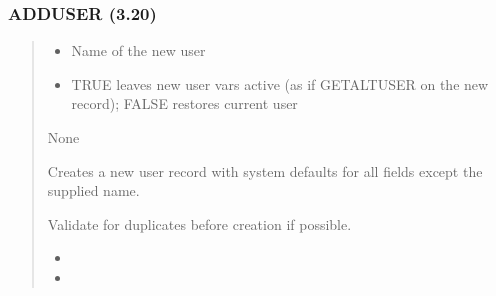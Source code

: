 \documentclass[letterpaper,10pt,english]{sphinxmanual}
\begin{document}
\subsubsection{ADDUSER (3.20)}
\label{\detokenize{ppl:adduser-3-20}}\begin{quote}

\sphinxAtStartPar
{}
\begin{description}
\begin{itemize}
\item {} 
\sphinxAtStartPar
{}     \textendash{} Name of the new user

\item {} 
\sphinxAtStartPar
{}  \textendash{} TRUE leaves new user vars active (as if GETALTUSER on the new record); FALSE restores current user

\end{itemize}

\sphinxAtStartPar
None

\sphinxAtStartPar
Creates a new user record with system defaults for all fields except the supplied name.

\end{description}

\sphinxAtStartPar
{}
\begin{quote}

\begin{sphinxVerbatim}[commandchars=\\\{\}]
  
 
\end{sphinxVerbatim}
\end{quote}
\begin{description}
\sphinxAtStartPar
Validate for duplicates before creation if possible.

\begin{itemize}
\item {} 
\sphinxAtStartPar
{}

\item {} 
\sphinxAtStartPar
{}

\end{itemize}

\end{description}
\end{quote}
\end{document}
